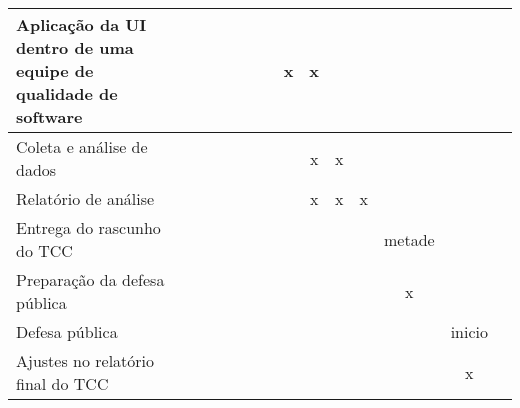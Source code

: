\documentclass[
	12pt,
	openright,
	twoside,
	a4paper,
	english,
	brazil
	]{abntex2}
\begin{document}
{\begin{tabular}{|p{5cm}|c|c|c|c|c|c|c|c|c|c|c|c|c|}
    Aplicação da UI dentro de uma equipe de qualidade de software           & & & & & & &x&x& & & &       \\ \hline
    Coleta e análise de dados                                               & & & & & & & &x&x& & &       \\ \hline
    Relatório de análise                                                    & & & & & & & &x&x&x& &       \\ \hline
    Entrega do rascunho do TCC                                              & & & & & & & & & & &metade&  \\ \hline
    Preparação da defesa pública                                            & & & & & & & & & & &x&       \\ \hline
    Defesa pública                                                          & & & & & & & & & & & &inicio \\ \hline
    Ajustes no relatório final do TCC                                       & & & & & & & & & & & &x      \\ \hline
  \end{tabular}
}


\postextual



\printindex

\end{document}

